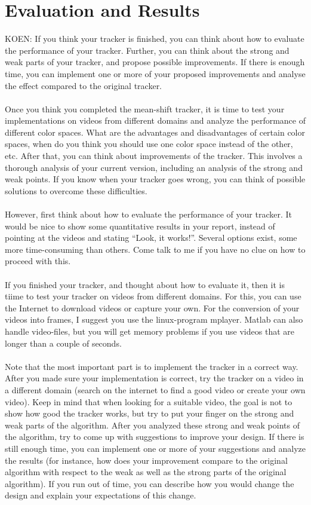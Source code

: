 \documentclass[a4paper,11pt]{article}
\begin{document}
	\section*{Evaluation and Results}
		KOEN: If you think your tracker is finished, you can think about how to evaluate
		the performance of your tracker. Further, you can think about the strong and
		weak parts of your tracker, and propose possible improvements. If there is
		enough time, you can implement one or more of your proposed improvements and
		analyse the effect compared to the original tracker.
		\\ \\
		Once you think you completed the mean-shift tracker, it is time to test your
		implementations on videos from different domains and analyze the performance
		of different color spaces. What are the advantages and disadvantages of certain
		color spaces, when do you think you should use one color space instead of the
		other, etc. After that, you can think about improvements of the tracker. This
		involves a thorough analysis of your current version, including an analysis of
		the strong and weak points. If you know when your tracker goes wrong, you can
		think of possible solutions to overcome these difficulties.
		\\ \\
		However, first think about how to evaluate the performance of your tracker. It
		would be nice to show some quantitative results in your report, instead of pointing
		at the videos and stating ``Look, it works!''. Several options exist, some more
		time-consuming than others. Come talk to me if you have no clue on how to proceed
		with this.
		\\ \\
		If you finished your tracker, and thought about how to evaluate it, then it is
		tiime to test your tracker on videos from different domains. For this, you can
		use the Internet to download videos or capture your own. For the conversion of
		your videos into frames, I suggest you use the linux-program mplayer. Matlab can
		also handle video-files, but you will get memory problems if you use videos that
		are longer than a couple of seconds.
		\\ \\
		Note that the most important part is to implement the tracker in a correct way.
		After you made sure your implementation is correct, try the tracker on a video
		in a different domain (search on the internet to find a good video or create your
		own video). Keep in mind that when looking for a suitable video, the goal is not
		to show how good the tracker works, but try to put your finger on the strong and
		weak parts of the algorithm. After you analyzed these strong and weak points of
		the algorithm, try to come up with suggestions to improve your design. If there
		is still enough time, you can implement one or more of your suggestions and analyze
		the results (for instance, how does your improvement compare to the original algorithm
		with respect to the weak as well as the strong parts of the original algorithm). If
		you run out of time, you can describe how you would change the design and explain your
		expectations of this change. 
\end{document}
